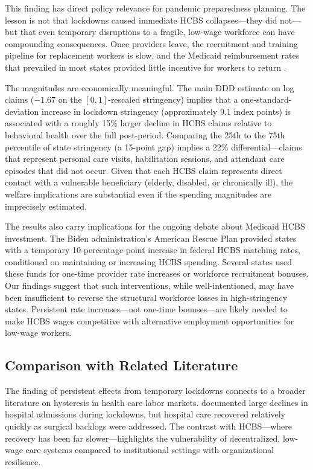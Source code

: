\documentclass[12pt]{article}
\begin{document}
This finding has direct policy relevance for pandemic preparedness planning. The lesson is not that lockdowns caused immediate HCBS collapses---they did not---but that even temporary disruptions to a fragile, low-wage workforce can have compounding consequences. Once providers leave, the recruitment and training pipeline for replacement workers is slow, and the Medicaid reimbursement rates that prevailed in most states provided little incentive for workers to return \citep{marquand2021}.

The magnitudes are economically meaningful. The main DDD estimate on log claims ($-1.67$ on the $[0,1]$-rescaled stringency) implies that a one-standard-deviation increase in lockdown stringency (approximately 9.1 index points) is associated with a roughly 15\% larger decline in HCBS claims relative to behavioral health over the full post-period. Comparing the 25th to the 75th percentile of state stringency (a 15-point gap) implies a 22\% differential---claims that represent personal care visits, habilitation sessions, and attendant care episodes that did not occur. Given that each HCBS claim represents direct contact with a vulnerable beneficiary (elderly, disabled, or chronically ill), the welfare implications are substantial even if the spending magnitudes are imprecisely estimated.

The results also carry implications for the ongoing debate about Medicaid HCBS investment. The Biden administration's American Rescue Plan provided states with a temporary 10-percentage-point increase in federal HCBS matching rates, conditioned on maintaining or increasing HCBS spending. Several states used these funds for one-time provider rate increases or workforce recruitment bonuses. Our findings suggest that such interventions, while well-intentioned, may have been insufficient to reverse the structural workforce losses in high-stringency states. Persistent rate increases---not one-time bonuses---are likely needed to make HCBS wages competitive with alternative employment opportunities for low-wage workers.

\subsection{Comparison with Related Literature}

The finding of persistent effects from temporary lockdowns connects to a broader literature on hysteresis in health care labor markets. \citet{birkmeyer2020impact} documented large declines in hospital admissions during lockdowns, but hospital care recovered relatively quickly as surgical backlogs were addressed. The contrast with HCBS---where recovery has been far slower---highlights the vulnerability of decentralized, low-wage care systems compared to institutional settings with organizational resilience.
\end{document}
